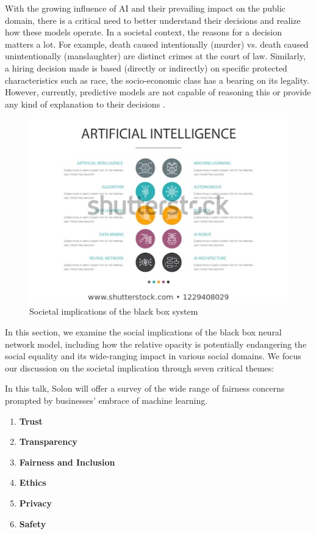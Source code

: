 With the growing influence of AI and their prevailing impact on the public domain, there is a critical need to better understand their decisions and realize how these models operate.  In a societal context, the reasons for a decision matters a lot. For example, death caused intentionally (murder) vs. death caused unintentionally (manslaughter) are distinct crimes at the court of law. Similarly, a hiring decision made is based (directly or indirectly) on specific protected characteristics such as race, the socio-economic class has a bearing on its legality. However, currently, predictive models are not capable of reasoning this or provide any kind of explanation to their decisions \cite{molnar}.

\begin{figure}[htbp]
\centering
\includegraphics[width=1\textwidth]{images/societal-impact-1.jpg}
\caption{Societal implications of the black box system}
\label{fig:societal-impacts}
\end{figure}

In this section, we examine the social implications of the black box neural network model, including how the relative opacity is potentially endangering the social equality and its wide-ranging impact in various social domains. We focus our discussion on the societal implication through seven critical themes:

In this talk, Solon will offer a survey of the wide range of fairness concerns prompted by businesses' embrace of machine learning.

\begin{enumerate}
\item \textbf{Trust}
\item  \textbf{Transparency}
\item \textbf{Fairness and Inclusion}
\item \textbf{Ethics}
\item \textbf{Privacy}
\item \textbf{Safety}
\end{enumerate}

